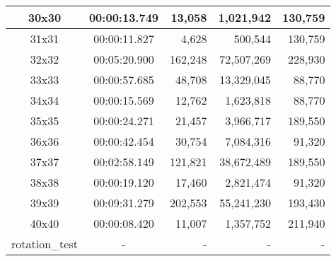 \begin{center}
\begin{tabular}{|c|c|r|r|r|}
		30x30 & 00:00:13.749 & 13,058 & 1,021,942 & 130,759 \\ \hline
		31x31 & 00:00:11.827 & 4,628 & 500,544 & 130,759 \\ \hline
		32x32 & 00:05:20.900 & 162,248 & 72,507,269 & 228,930 \\ \hline
		33x33 & 00:00:57.685 & 48,708 & 13,329,045 & 88,770 \\ \hline
		34x34 & 00:00:15.569 & 12,762 & 1,623,818 & 88,770 \\ \hline
		35x35 & 00:00:24.271 & 21,457 & 3,966,717 & 189,550 \\ \hline
		36x36 & 00:00:42.454 & 30,754 & 7,084,316 & 91,320 \\ \hline
		37x37 & 00:02:58.149 & 121,821 & 38,672,489 & 189,550 \\ \hline
		38x38 & 00:00:19.120 & 17,460 & 2,821,474 & 91,320 \\ \hline
		39x39 & 00:09:31.279 & 202,553 & 55,241,230 & 193,430 \\ \hline
		40x40 & 00:00:08.420 & 11,007 & 1,357,752 & 211,940 \\ \hline
		rotation\_test & - & - & - & - \\ \hline

    \end{tabular}
\end{center}
